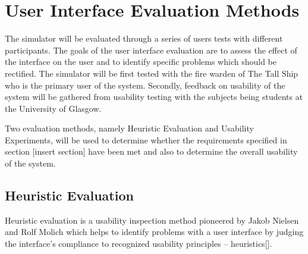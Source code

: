 

%
\section{User Interface Evaluation Methods}
\label{evalmethods}

The simulator will be evaluated through a series of users tests with different participants. The goals of the user interface evaluation are to assess the effect of the interface on the user and to identify specific problems which should be rectified. The simulator will be first tested with the fire warden of The Tall Ship who is the primary user of the system. Secondly, feedback on usability of the system will be gathered from usability testing with the subjects being students at the University of Glasgow.

Two evaluation methods, namely Heuristic Evaluation and Usability Experiments, will be used to determine whether the requirements specified in section [insert section] have been met and also to determine the overall usability of the system.

\subsection{Heuristic Evaluation}
Heuristic evaluation is a usability inspection method pioneered by Jakob Nielsen and Rolf Molich which helps to identify problems with a user interface by judging the interface’s compliance to recognized usability principles -- heuristics[].

